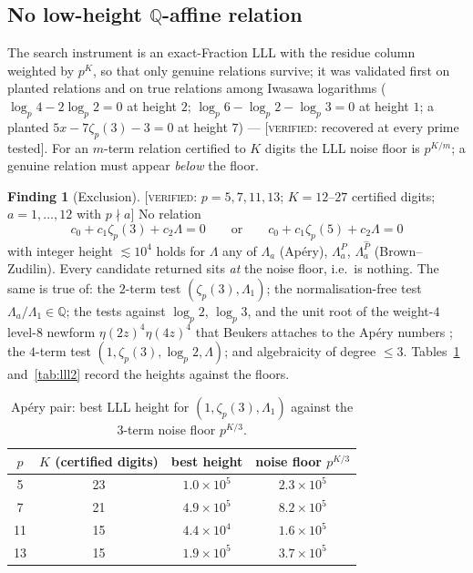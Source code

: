 \documentclass[11pt,reqno]{article}
\newcommand{\QQ}{\mathbb{Q}}
\newcommand{\Ph}{\widehat{P}}
\newcommand{\Lah}{\Lambda^{\Ph}}
\newcommand{\Lap}{\Lambda^{P}}
\newcommand{\VER}[1]{{\normalfont\textsc{[verified:} #1\textsc{]}}}
\theoremstyle{plain}
\theoremstyle{definition}
\newtheorem{finding}[theorem]{Finding}
\theoremstyle{remark}
\numberwithin{equation}{section}
\begin{document}
\subsection{No low-height $\QQ$-affine relation}\label{ss:LLL}

The search instrument is an exact-Fraction LLL with the residue column weighted
by $p^{K}$, so that only genuine relations survive; it was validated first on
planted relations and on true relations among Iwasawa logarithms
($\log_p4-2\log_p2=0$ at height $2$; $\log_p6-\log_p2-\log_p3=0$ at height $1$;
a planted $5x-7\zeta_p(3)-3=0$ at height $7$) --- \VER{recovered at every prime
tested}.  For an $m$-term relation certified to $K$ digits the LLL noise floor
is $p^{K/m}$; a genuine relation must appear \emph{below} the floor.

\begin{finding}[Exclusion]\label{find:exclusion}
\VER{$p=5,7,11,13$; $K=12$--$27$ certified digits; $a=1,\dots,12$ with $p\nmid a$}
No relation
\[
  c_0+c_1\zeta_p(3)+c_2\Lambda=0
  \qquad\text{or}\qquad
  c_0+c_1\zeta_p(5)+c_2\Lambda=0
\]
with integer height $\lesssim10^4$ holds for $\Lambda$ any of $\Lambda_a$
(Ap\'ery), $\Lap_a$, $\Lah_a$ (Brown--Zudilin).  Every candidate returned sits
\emph{at} the noise floor, i.e.\ is nothing.  The same is true of:
the $2$-term test $(\zeta_p(3),\Lambda_1)$; the normalisation-free test
$\Lambda_a/\Lambda_1\in\QQ$; the tests against $\log_p2$, $\log_p3$, and the
unit root of the weight-$4$ level-$8$ newform $\eta(2z)^4\eta(4z)^4$ that
Beukers attaches to the Ap\'ery numbers \cite{Beukers1987}; the $4$-term
test $(1,\zeta_p(3),\log_p2,\Lambda)$; and algebraicity of degree $\le3$.
Tables~\ref{tab:lll1} and~\ref{tab:lll2} record the heights against the floors.
\end{finding}

\begin{table}[h]
\centering\small
\caption{Ap\'ery pair: best LLL height for $(1,\zeta_p(3),\Lambda_1)$ against
the $3$-term noise floor $p^{K/3}$.}
\label{tab:lll1}
\begin{tabular}{@{}cccc@{}}
\toprule
$p$ & $K$ (certified digits) & best height & noise floor $p^{K/3}$\\
\midrule
5 & 23 & $1.0\times10^5$ & $2.3\times10^5$\\
7 & 21 & $4.9\times10^5$ & $8.2\times10^5$\\
11 & 15 & $4.4\times10^4$ & $1.6\times10^5$\\
13 & 15 & $1.9\times10^5$ & $3.7\times10^5$\\
\bottomrule
\end{tabular}
\end{table}
\end{document}
